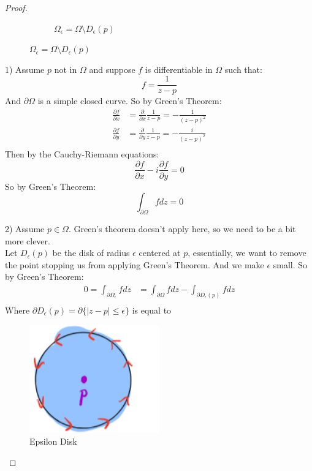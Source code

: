 \begin{example}
\begin{proof}
\begin{figure}[H]
\begin{subfigure}{0.4\textwidth}
                \caption{$\Omega_{\epsilon} = \Omega \setminus D_{\epsilon}(p)$}
            \end{subfigure}
        \end{figure}
        1) Assume $p$ not in $\Omega$ and suppose $f$ is differentiable in $\Omega$ such that:
        $$f = \frac{1}{z - p}$$
        And $\partial \Omega$ is a simple closed curve. So by Green's Theorem:
        \begin{align*}
            \frac{\partial f}{\partial x} & = \frac{\partial}{\partial x} \frac{1}{z - p} = -\frac{1}{(z - p)^2} \\
            \frac{\partial f}{\partial y} & = \frac{\partial}{\partial y} \frac{1}{z - p} =- \frac{i}{(z - p)^2} \\
        \end{align*}
        Then by the Cauchy-Riemann equations:
        $$ \frac{\partial f}{\partial x} - i\frac{\partial f}{\partial y} = 0 $$
        So by Green's Theorem:
        $$ \int_{\partial \Omega} f dz = 0 $$

        2) Assume $p \in \Omega$. Green's theorem doesn't apply here, so we need to be a bit more clever.\\
        Let $D_{\epsilon}(p)$ be the disk of radius $\epsilon$ centered at $p$, essentially, we want to remove the point stopping us from applying Green's Theorem. And we make $\epsilon$ small. So by Green's Theorem:
        \begin{align*}
            0 = \int_{\partial \Omega_\epsilon} f dz & = \int_{\partial \Omega} f dz - \int_{\partial D_{\epsilon}(p)} f dz \\
        \end{align*}
        Where $\partial D_{\epsilon}(p) = \partial \{|z-p| \leq \epsilon\}$ is equal to
        \begin{figure}[H]
            \centering
            \includegraphics[width=0.5\textwidth]{LECTURE_4/epsilon.png}
            \caption{Epsilon Disk}
        \end{figure}


\end{proof}
\end{example}
